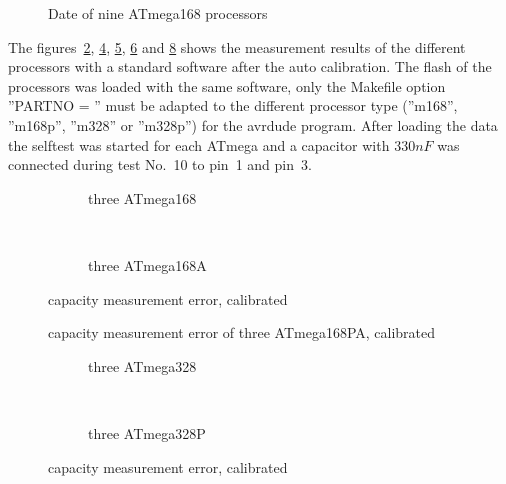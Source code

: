 \begin{figure}[H]
\centering

\caption{Date of nine ATmega168 processors}
\label{fig:CompAdjust}
\end{figure}

The figures~\ref{fig:mega168cal}, \ref{fig:mega168Acal}, \ref{fig:mega168PAcal}, \ref{fig:mega328cal} and \ref{fig:mega328Pcal}
 shows the measurement results
of the different processors with a standard software after the auto calibration.
The flash of the processors was loaded with the same software, only the Makefile  option ''PARTNO = '' must be
adapted to the different processor type (''m168'', ''m168p'', ''m328'' or ''m328p'') for the avrdude program.
After loading the data the selftest was started for each ATmega and a capacitor with \(330 nF\) was connected
during test No.~10 to pin~1 and pin~3.

\begin{figure}[H]
  \begin{subfigure}[b]{9cm}
    \centering
    \resizebox{9cm}{!}{}
    \caption{three ATmega168}
    \label{fig:mega168cal}
  \end{subfigure}
  ~
  \begin{subfigure}[b]{9cm}
    \centering
    \resizebox{9cm}{!}{}
    \caption{three ATmega168A}
    \label{fig:mega168Acal}
  \end{subfigure}
  \caption{capacity measurement error, calibrated}
\end{figure}

\begin{figure}[H]
\centering

\caption{capacity measurement error of three ATmega168PA, calibrated}
\label{fig:mega168PAcal}
\end{figure}

\begin{figure}[H]
  \begin{subfigure}[b]{9cm}
    \centering
    \resizebox{9cm}{!}{}
    \caption{three ATmega328}
    \label{fig:mega328cal}
  \end{subfigure}
  ~
  \begin{subfigure}[b]{9cm}
    \centering
    \resizebox{9cm}{!}{}
    \caption{three ATmega328P}
    \label{fig:mega328Pcal}
  \end{subfigure}
  \caption{capacity measurement error, calibrated}
\end{figure}

